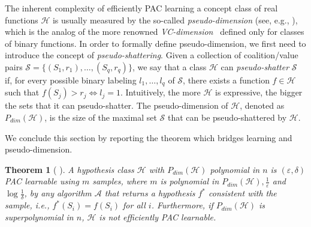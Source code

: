 \documentclass[letterpaper]{article} %
\newtheorem{theorem}{Theorem}[section]
\newcommand{\hclass}{\ensuremath{\mathcal{H}}}
\newcommand{\sample}{\ensuremath{\mathcal{S}}}
\begin{document}
The inherent complexity of efficiently PAC learning a concept class of real functions $\hclass$ is usually measured by the so-called \emph{pseudo-dimension} (see, e.g., \citet{AnthonyBartlett}), which is the analog of the more renowned \emph{VC-dimension}~\cite{KearnsVazirani} defined only for classes of binary functions.
%
In order to formally define pseudo-dimension, we first need to introduce the concept of \emph{pseudo-shattering}. Given a collection of coalition/value pairs $\sample = \{(S_1, r_1), \ldots, (S_q, r_q)\}$, we say that a class $\hclass$ can \emph{pseudo-shatter} $\sample$ if, for every possible binary labeling $l_1,\ldots, l_q$ of $\sample$, there exists a function $f \in \hclass$ such that $f(S_j) > r_j \iff l_j=1$. Intuitively, the more $\hclass$ is expressive, the bigger the sets that it can pseudo-shatter. The pseudo-dimension of $\hclass$, denoted as $P_{dim}(\hclass)$, is the size of the maximal set $\sample$ that can be pseudo-shattered by $\hclass$.
%

We conclude this section by reporting the theorem which bridges learning and pseudo-dimension.
\begin{theorem}[\citeauthor{AnthonyBartlett} \citeyear{AnthonyBartlett}]\label{thm:PAC_learnability}
A hypothesis class $\mathcal{H}$ with $P_{dim}(\hclass)$ polynomial in $n$ is $(\varepsilon, \delta)$ PAC learnable using $m$ samples, where $m$ is polynomial in $P_{dim}(\mathcal{H}), \frac{1}{\varepsilon}$ and $\log \frac{1}{\delta}$, by any algorithm $\mathcal{A}$ that returns a hypothesis $f^*$ consistent with the sample, i.e., $f^*(S_i)=f(S_i)$ for all $i$.
Furthermore, if $P_{dim}(\mathcal{H})$ is superpolynomial in $n$, $\mathcal{H}$ is not efficiently PAC learnable.
\end{theorem}
\end{document}

